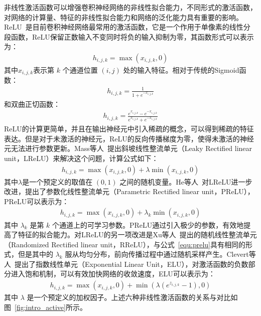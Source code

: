 非线性激活函数可以增强卷积神经网络的非线性拟合能力，不同形式的激活函数，对网络的计算量、特征的非线性拟合能力和网络的泛化能力具有重要的影响。ReLU~\cite{nair2010rectified}是目前卷积神经网络最常用的激活函数，它是一个作用于单像素的线性分段函数，ReLU保留正数输入不变同时将负的输入抑制为零，其函数形式可以表示为：
\begin{eqnarray} \label{equ:relu}
h_{i,j,k}=\max(x_{i,j,k},0)
\end{eqnarray}
其中$x_{i,j,k}$表示第 $k$ 个通道位置 $(i,j)$ 处的输入特征。相对于传统的Sigmoid函数：
\begin{eqnarray} \label{equ:sigmoid}
h_{i,j,k}=\frac{1}{1+e^{-x_{i,j,k}}}
\end{eqnarray}
和双曲正切函数：
\begin{eqnarray} \label{equ:tanh}
h_{i,j,k}=\frac{e^{x_{i,j,k}}-e^{-x_{i,j,k}}}{e^{x_{i,j,k}}+e^{-x_{i,j,k}}}
\end{eqnarray}
ReLU的计算更简单，并且在输出神经元中引入稀疏的概念，可以得到稀疏的特征表达。但是对于未激活的神经元，ReLU的反向传播梯度为零，使得未激活的神经元无法进行参数更新。Mass等人~\cite{maas2013rectifier}提出斜坡线性整流单元（Leaky Rectified linear unit，LReLU）来解决这个问题，计算公式如下：
\begin{eqnarray} \label{equ:lrelu}
h_{i,j,k}=\max(x_{i,j,k},0)+{\lambda}\min(x_{i,j,k},0)
\end{eqnarray}
其中$\lambda$是一个预定义的取值在 $(0,1)$ 之间的随机变量。He等人~\cite{he2015delving}对LReLU进一步改进，提出了参数化线性整流单元（Parametric Rectified linear unit，PReLU），PReLU可以表示为：
\begin{eqnarray} \label{equ:prelu}
h_{i,j,k}=\max(x_{i,j,k},0)+{\lambda}_k\min(x_{i,j,k},0)
\end{eqnarray}
其中 ${\lambda}_k$ 是第 $k$ 个通道上的可学习参数。PReLU通过引入极少的参数，有效地提高了特征的拟合能力。对LReLU的另一项改进是Xu等人~\cite{xu2015empirical}提出的随机线性整流单元（Randomized Rectified linear unit，RReLU），与公式~\ref{equ:prelu}具有相同的形式，但是其中的 ${\lambda}_k$ 服从均匀分布，前向传播过程中通过随机采样产生。Clevert等人~\cite{clevert2015fast}提出了指数线性单元（Exponential Linear Unit，ELU），对激活函数的负数部分进入饱和机制，可以有效加快网络的收敛速度，ELU可以表示为：
\begin{eqnarray} \label{equ:elu}
h_{i,j,k}=\max(x_{i,j,k},0)+\min({\lambda}(e^{z_{i,j,k}}-1),0)
\end{eqnarray}
其中 $\lambda$ 是一个预定义的加权因子。上述六种非线性激活函数的关系与对比如图~\ref{fig:intro_active}所示。


